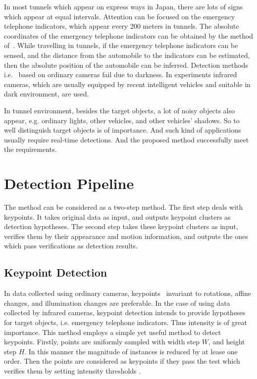In most tunnels which appear on express ways in Japan, there are lots of signs which appear at equal intervals. Attention can be focused on the emergency telephone indicators, which appear every 200 meters in tunnels. The absolute coordinates of the emergency telephone indicators can be obtained by the method of~\citep{xue}. While travelling in tunnels, if the emergency telephone indicators can be sensed, and the distance from the automobile to the indicators can be estimated, then the absolute position of the automobile can be inferred. Detection methods i.e.~\citep{ac23} based on ordinary cameras fail due to darkness. In experiments infrared cameras, which are usually equipped by recent intelligent vehicles and  suitable in dark environment, are used.

 In tunnel environment, besides the target objects, a lot of noisy objects also appear, e.g. ordinary lights, other vehicles, and other vehicles' shadows. So to well distinguish target objects is of importance. And such kind of applications usually require real-time detections. And the proposed method successfully meet the requirements.

\section{Detection Pipeline}
\label{pip}
The method can be considered as a two-step method. The first step deals with keypoints. It
takes original data as input, and outputs keypoint clusters as detection hypotheses. The second
step takes these keypoint clusters as input, verifies them by their appearance and motion
information, and outputs the ones which pass verifications as detection results.

\subsection{Keypoint Detection}
In data collected using ordinary cameras, keypoints~\citep{o2,o12} invariant to rotations, affine changes, and illumination changes are preferable. In the case of using data collected by infrared cameras, keypoint detection intends to provide hypotheses for target objects, i.e. emergency telephone indicators. Thus intensity is of great importance. This method employs a simple yet useful method to detect keypoints. Firstly, points are uniformly sampled with width step $W$, and height step $H$. In this manner the magnitude of instances is reduced by  at lease one order. Then the points are considered as keypoints if they pass the test which verifies them by setting intensity thresholds .

